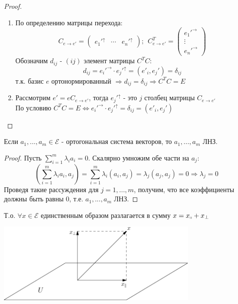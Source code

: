 \begin{proof} \tab
    \begin{enumerate}
        \item По определению матрицы перехода:
        $$C_{e \to e'} = \begin{pmatrix}
            e_1'^{\uparrow} & \cdots & e_n'^{\uparrow}
        \end{pmatrix}; \ \ 
        C^T_{e\to e'} = \begin{pmatrix}
            e_1'^{\rightarrow}  \\ \vdots \\ e_n'^{\rightarrow} 
        \end{pmatrix}$$ 
        Обозначим $d_{ij}$ - $(ij)$ элемент матрицы $C^TC:$ 
        $$d_{ij} = e_i'^{\rightarrow} \cdot e_j'^{\uparrow} = (e'_i,e_j') = \delta_{ij}$$
        т.к. базис $e$ ортонормированный $\Longrightarrow d_{ij} = \delta_{ij} \Longrightarrow C^TC = E$
        \item Рассмотрим $e' = eC_{e\to e'}$, тогда $e_j'^{\uparrow}$ - это $j$ столбец матрицы $C_{e\to e'}$\\
        По условию $C^TC = E \Longleftrightarrow e_i'^{\rightarrow} \cdot e_j'^{\uparrow} = \delta_{ij} = (e'_i,e_j')$
    \end{enumerate}    
\end{proof}
\begin{lemma}
    Если $a_1,...,a_m \in \mathcal{E}$ - ортогональная система векторов, то $a_1,...,a_m$ ЛНЗ. 
\end{lemma}
\begin{proof}
    Пусть $\sum \limits_{i=1}^m \lambda_ia_i = 0$. Скалярно умножим обе части на $a_j$:
    \[(\sum \limits_{i=1}^m \lambda_ia_i, a_j) = \sum \limits_{i=1}^m \lambda_i(a_i, a_j) = \lambda_j(a_j, a_j) = 0 \Longrightarrow \lambda_j = 0\]
    Проведя такие рассуждения для $j = 1,...,m$, получим, что все коэффициенты должны быть равны 0, т.е. $a_1,...,a_m$ ЛНЗ.
\end{proof}
Т.о. $\forall x \in \mathcal{E}$ единственным образом разлагается в сумму $x = x_{\shortparallel} + x_{\perp}$
\begin{center}
    \includegraphics[width=10cm]{image/Asymptote/3/linal-3-1.pdf}
\end{center}

